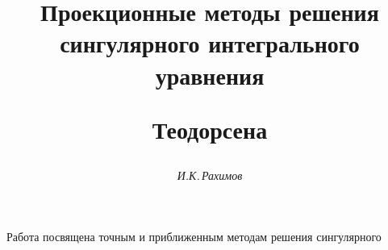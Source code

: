 




%


\newcommand{\ctg}{\operatorname{ctg}}


\newcommand{\tts}[1]{} 







\setcounter{page}{67}















\author{\it И.К.\,Рахимов}




\title{Проекционные методы решения сингулярного интегрального уравнения 


Теодорсена}





\date{}




\pagestyle{plain} %







\maketitle


\label{begin}





Работа посвящена точным и приближенным методам решения сингулярного 


